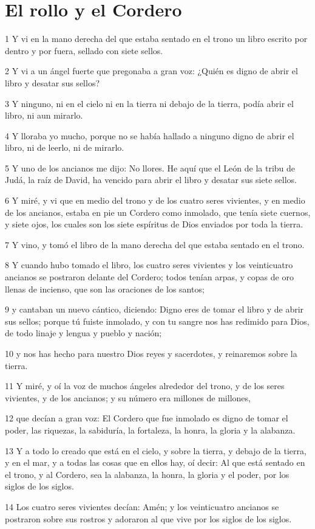 \section*{El rollo y el Cordero}

\par 1 Y vi en la mano derecha del que estaba sentado en el trono un libro escrito por dentro y por fuera, sellado con siete sellos.
\par 2 Y vi a un ángel fuerte que pregonaba a gran voz: ¿Quién es digno de abrir el libro y desatar sus sellos?
\par 3 Y ninguno, ni en el cielo ni en la tierra ni debajo de la tierra, podía abrir el libro, ni aun mirarlo.
\par 4 Y lloraba yo mucho, porque no se había hallado a ninguno digno de abrir el libro, ni de leerlo, ni de mirarlo.
\par 5 Y uno de los ancianos me dijo: No llores. He aquí que el León de la tribu de Judá, la raíz de David, ha vencido para abrir el libro y desatar sus siete sellos.
\par 6 Y miré, y vi que en medio del trono y de los cuatro seres vivientes, y en medio de los ancianos, estaba en pie un Cordero como inmolado, que tenía siete cuernos, y siete ojos, los cuales son los siete espíritus de Dios enviados por toda la tierra.
\par 7 Y vino, y tomó el libro de la mano derecha del que estaba sentado en el trono.
\par 8 Y cuando hubo tomado el libro, los cuatro seres vivientes y los veinticuatro ancianos se postraron delante del Cordero; todos tenían arpas, y copas de oro llenas de incienso, que son las oraciones de los santos;
\par 9 y cantaban un nuevo cántico, diciendo: Digno eres de tomar el libro y de abrir sus sellos; porque tú fuiste inmolado, y con tu sangre nos has redimido para Dios, de todo linaje y lengua y pueblo y nación;
\par 10 y nos has hecho para nuestro Dios reyes y sacerdotes, y reinaremos sobre la tierra.
\par 11 Y miré, y oí la voz de muchos ángeles alrededor del trono, y de los seres vivientes, y de los ancianos; y su número era millones de millones,
\par 12 que decían a gran voz: El Cordero que fue inmolado es digno de tomar el poder, las riquezas, la sabiduría, la fortaleza, la honra, la gloria y la alabanza.
\par 13 Y a todo lo creado que está en el cielo, y sobre la tierra, y debajo de la tierra, y en el mar, y a todas las cosas que en ellos hay, oí decir: Al que está sentado en el trono, y al Cordero, sea la alabanza, la honra, la gloria y el poder, por los siglos de los siglos.
\par 14 Los cuatro seres vivientes decían: Amén; y los veinticuatro ancianos se postraron sobre sus rostros y adoraron al que vive por los siglos de los siglos.

